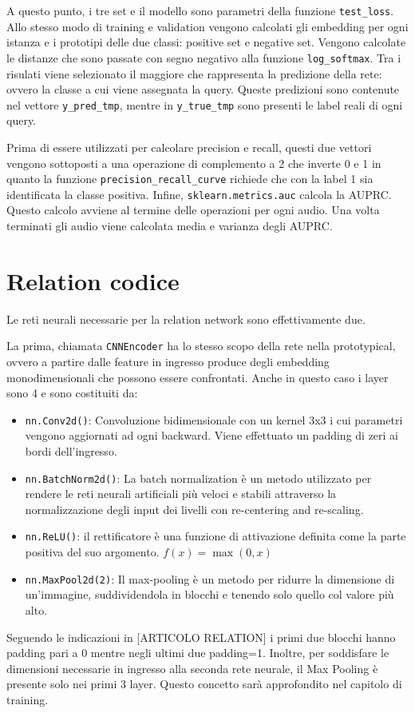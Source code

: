\documentclass[12pt,a4paper,titlepage]{article}
\begin{document}
A questo punto, i tre set e il modello sono parametri della funzione \texttt{test\_loss}.
Allo stesso modo di training e validation vengono calcolati gli embedding per ogni istanza e i prototipi delle due classi: positive set e negative set.
Vengono calcolate le distanze che sono passate con segno negativo alla funzione \texttt{log\_softmax}.
Tra i risulati viene selezionato il maggiore che rappresenta la predizione della rete: ovvero la classe a cui viene assegnata la query.
Queste predizioni sono contenute nel vettore \texttt{y\_pred\_tmp}, mentre in \texttt{y\_true\_tmp} sono presenti le label reali di ogni query.

Prima di essere utilizzati per calcolare precision e recall, questi due vettori vengono sottoposti a una operazione di complemento a 2 che inverte 0 e 1 in quanto la funzione \texttt{precision\_recall\_curve} richiede che con la label 1 sia identificata la classe positiva.
Infine, \texttt{sklearn.metrics.auc} calcola la AUPRC.
Questo calcolo avviene al termine delle operazioni per ogni audio.
Una volta terminati gli audio viene calcolata media e varianza degli AUPRC.

\section{Relation codice}
Le reti neurali necessarie per la relation network sono effettivamente due.

La prima, chiamata \texttt{CNNEncoder} ha lo stesso scopo della rete nella prototypical, ovvero a partire dalle feature in ingresso produce degli embedding monodimensionali che possono essere confrontati.
Anche in questo caso i layer sono 4 e sono costituiti da:
\begin{itemize}
	\item \texttt{nn.Conv2d()}: Convoluzione bidimensionale con un kernel 3x3 i cui parametri vengono aggiornati ad ogni backward. Viene effettuato un padding di zeri ai bordi dell'ingresso.
	\item \texttt{nn.BatchNorm2d()}: La batch normalization è un metodo utilizzato per rendere le reti neurali artificiali più veloci e stabili attraverso la normalizzazione degli input dei livelli con re-centering and re-scaling.
	\item \texttt{nn.ReLU()}: il rettificatore è una funzione di attivazione definita come la parte positiva del suo argomento. $f(x)=\max(0,x)$
	\item \texttt{nn.MaxPool2d(2)}: Il max-pooling è un metodo per ridurre la dimensione di un’immagine, suddividendola in blocchi e tenendo solo quello col valore più alto.
\end{itemize}
Seguendo le indicazioni in [ARTICOLO RELATION] i primi due blocchi hanno padding pari a 0 mentre negli ultimi due padding=1.
Inoltre, per soddisfare le dimensioni necessarie in ingresso alla seconda rete neurale, il Max Pooling è presente solo nei primi 3 layer. Questo concetto sarà approfondito nel capitolo di training.
\end{document}
